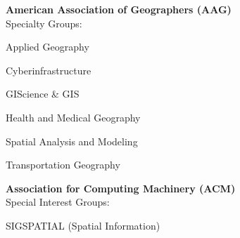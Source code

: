 \documentclass{acmcv}
\begin{document}

    \textbf{American Association of Geographers (AAG)} \\
    Specialty Groups: \\ \vspace{-.3cm}
    \begin{multicols}{2}
    \begin{titemize}
        \item Applied Geography
        \item Cyberinfrastructure
        \item GIScience \& GIS
        \item Health and Medical Geography
        \item Spatial Analysis and Modeling
        \item Transportation Geography
    \end{titemize}
    \end{multicols}

    \textbf{Association for Computing Machinery (ACM)} \\
    Special Interest Groups: \\ 
    \begin{titemize}
        \item SIGSPATIAL (Spatial Information)
    \end{titemize}

\pagebreak
\end{document}
